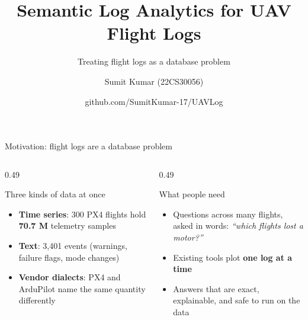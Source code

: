 \documentclass[aspectratio=169,10pt]{beamer}
\title{Semantic Log Analytics for UAV Flight Logs}
\subtitle{Treating flight logs as a database problem}
\author{Sumit Kumar (22CS30056)}
\institute{Advanced Database Management Systems, term project}
\date{\footnotesize github.com/SumitKumar-17/UAVLog}
\begin{document}
\begin{frame}[plain]\titlepage\end{frame}

\begin{frame}[shrink=5]{Motivation: flight logs are a database problem}
\begin{columns}[T]
\begin{column}{0.49\textwidth}
\begin{block}{Three kinds of data at once}
\begin{itemize}
  \item \textbf{Time series}: 300 PX4 flights hold \textbf{70.7 M} telemetry samples
  \item \textbf{Text}: 3,401 events (warnings, failure flags, mode changes)
  \item \textbf{Vendor dialects}: PX4 and ArduPilot name the same quantity differently
\end{itemize}
\end{block}
\end{column}
\begin{column}{0.49\textwidth}
\begin{block}{What people need}
\begin{itemize}
  \item Questions across many flights, asked in words: \emph{``which flights lost a motor?''}
  \item Existing tools plot \textbf{one log at a time}
  \item Answers that are exact, explainable, and safe to run on the data
\end{itemize}
\end{block}
\end{column}
\end{columns}
\end{frame}
\end{document}
